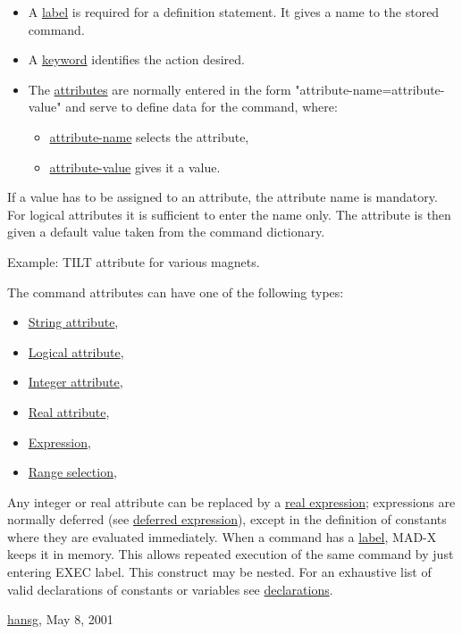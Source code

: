 \begin{itemize}
	\item A \href{label.html}{label}
is required for a definition statement.
It gives a name to the stored command.

	\item A \href{keyword.html}{keyword}
identifies the action desired.

	\item The \href{attribute HREF=attribute.html}{attributes}
are normally entered in the form
"attribute-name=attribute-value"
and serve to define data for the command, where:

\begin{itemize}
	\item \href{label.html}{attribute-name} selects the attribute,

	\item \href{attribute.html}{attribute-value} gives it a value.

\end{itemize}
\end{itemize}
If a value has to be assigned to an attribute, the
attribute name is mandatory.
For logical attributes it is sufficient to enter the name only.
The attribute is then given a default value taken from the
command dictionary.



Example: TILT attribute for various magnets.



The command attributes can have one of the following types:

\begin{itemize}
	\item \href{string.html}{String attribute},

	\item \href{logical.html}{Logical attribute},

	\item \href{integer.html}{Integer attribute},

	\item \href{real.html}{Real attribute},

	\item \href{expression.html}{Expression},

	\item \href{select.html}{Range selection},

\end{itemize}
Any integer or real attribute can be replaced by
a \href{expression.html}{real expression}; expressions are
normally deferred (see 
\href{expression.html#defer}{deferred expression}), except in the
definition of constants where they are evaluated immediately.
When a command has a \href{label.html}{label},
MAD-X keeps it in memory.
This allows repeated execution of the same command
by just entering EXEC label. This construct may be nested.
For an exhaustive list of valid declarations of constants or variables
see \href{declarations.html}{declarations}.


\href{http://www.cern.ch/Hans.Grote/hansg_sign.html}{hansg},
May 8, 2001



%
%
%


